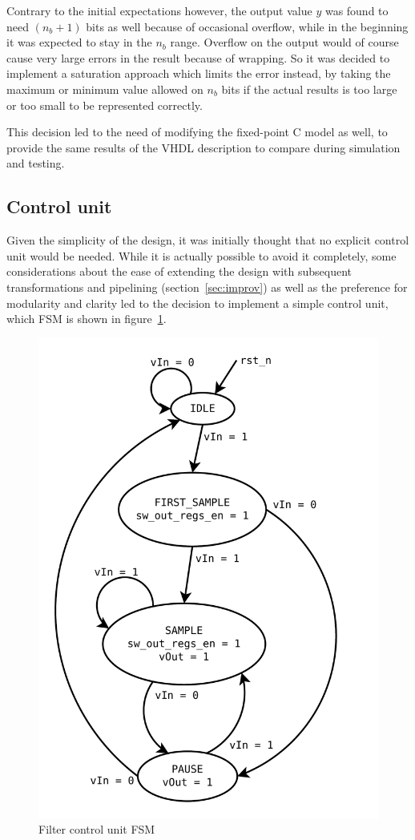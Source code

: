 \documentclass[a4paper]{article}
\begin{document}
Contrary to the initial expectations however, the output value $y$ was found to need $(n_b+1)$ bits as well because of occasional overflow, while in the beginning it was expected to stay in the $n_b$ range. Overflow on the output would of course cause very large errors in the result because of wrapping. So it was decided to implement a saturation approach which limits the error instead, by taking the maximum or minimum value allowed on $n_b$ bits if the actual results is too large or too small to be represented correctly.

This decision led to the need of modifying the fixed-point C model as well, to provide the same results of the VHDL description to compare during simulation and testing.

\subsection{Control unit}
Given the simplicity of the design, it was initially thought that no explicit control unit would be needed. While it is actually possible to avoid it completely, some considerations about the ease of extending the design with subsequent transformations and pipelining (section~\ref{sec:improv}) as well as the preference for modularity and clarity led to the decision to implement a simple control unit, which FSM is shown in figure~\ref{fig:fsm}.

\begin{figure}[hbtp]
    \centering
    \includegraphics[width=.5\linewidth]{media/fsm.pdf}
    \caption{Filter control unit FSM}
    \label{fig:fsm}
\end{figure}
\end{document}
